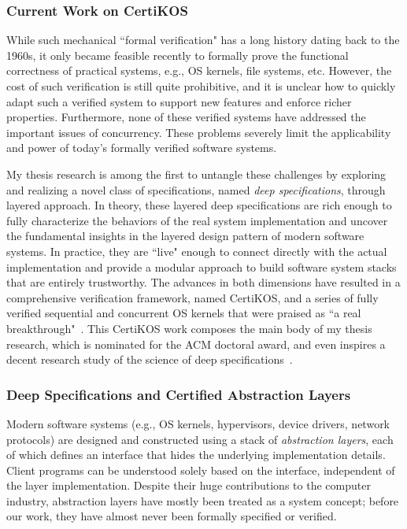 \documentclass[a4paper, 10pt]{article}
\begin{document}
\begin{small}

\subsubsection*{\large Current Work on CertiKOS}

While such mechanical ``formal verification" has a long history dating back to the 1960s,  it only became feasible recently to formally prove the functional correctness of practical systems, e.g., OS kernels, file systems, etc.
However, the cost of such verification is still quite prohibitive, and it is unclear how to quickly adapt such a verified system to support new features and enforce richer properties. Furthermore, none of these verified systems have addressed the important
issues of concurrency.
These problems severely limit
the applicability and power of today's formally verified
software systems.

My thesis research is among the first to untangle these challenges by exploring and realizing a novel class of specifications, named 
\emph{deep specifications}, through layered approach. 
In theory, these layered deep specifications are rich
enough to fully characterize the behaviors of the real system implementation
and
uncover the fundamental
insights in the  layered design pattern of modern software systems. In practice, they are ``live" enough to  connect directly  with the actual  implementation and provide a modular approach to build
 software system stacks that are entirely trustworthy.
The advances in both dimensions have resulted in a comprehensive
verification framework, named CertiKOS, and
a series of fully verified sequential and concurrent OS kernels that were praised as ``a real breakthrough"~\cite{news, dnews}.
This CertiKOS work composes the main body of my thesis research, which is nominated for the ACM doctoral award,
and even inspires a decent research study of the science of deep specifications~\cite{deepspec}.


\subsubsection*{\small Deep Specifications and Certified Abstraction Layers}
Modern software systems (e.g., OS kernels, hypervisors, device drivers, network protocols) are designed and constructed using a
stack of \emph{abstraction layers},
each of which defines an interface that hides the underlying implementation
details. Client programs can be understood solely based on the interface,
independent of the layer implementation. Despite their huge contributions
to the computer industry,
abstraction layers have mostly been treated as a system
concept; before our work, they have almost never been formally specified or verified.


\end{small}
\end{document}
